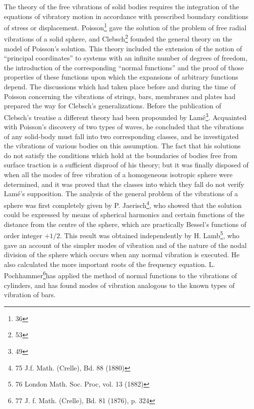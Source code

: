 The theory of the free vibrations of solid bodies requires the integration
of the equations of vibratory motion in accordance with prescribed boundary
conditions of stress or displacement. Poisson\footnote{36} gave the solution of the
problem of free radial vibrations of a solid sphere, and Clebsch\footnote{53}
founded the general theory on the model of Poisson's solution. This theory
included the extension of the notion of ``principal coordinates'' to systems
with an infinite number of degrees of freedom, the introduction of the
corresponding ``normal functions'' and the proof of those properties of these
functions upon which the expansions of arbitrary functions depend. The
discussions which had taken place before and during the time of Poisson
concerning the vibrations of strings, bars, membranes and plates had prepared
the way for Clebsch's generalizations. Before the publication of Clebsch's
treatise a different theory had been propounded by Lamé\footnote{49}.
Acquainted with Poisson's discovery of two types of waves, he concluded that
the vibrations of any solid-body must fall into two corresponding classes, and
he investigated the vibrations of various bodies on this assumption. The fact
that his solutions do not satisfy the conditions which hold at the boundaries
of bodies free from surface traction is a sufficient disproof of his theory;
but it was finally disposed of when all the modes of free vibration of a
homogeneous isotropic sphere were determined, \setcounter{footnote}{74}
and it was proved that the classes into which they fall do not verify
Lamé's supposition. The analysis of the general problem of the vibrations
of a sphere was first completely given by 
P. Jaerisch\footnote{75 J.f. Math. (Crelle), Bd. 88 (1880)},
who showed that the
solution could be expressed by means of spherical harmonics and certain
functions of the distance from the centre of the sphere, which are practically
Bessel's functions of order integer \(+1/2\). This result was obtained
independently by H. Lamb\footnote{76 London Math. Soc. Proc, vol. 13 (1882)},
who gave an account of the simpler modes of vibration
and of the nature of the nodal division of the sphere which occurs when any
normal vibration is executed. He also calculated the more important roots
of the frequency equation. 
L. Pochhammer\footnote{77 J. f. Math. (Crelle), Bd. 81 (1876), p. 324
}has applied the method of normal
functions to the vibrations of cylinders, and has found modes of vibration
analogous to the known types of vibration of bars.

